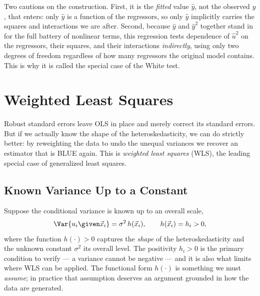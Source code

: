 
Two cautions on the construction. First, it is the \emph{fitted} value $\hat y$, not the observed $y$, that enters: only $\hat y$ is a function of the regressors, so only $\hat y$ implicitly carries the squares and interactions we are after. Second, because $\hat y$ and $\hat y^2$ together stand in for the full battery of nonlinear terms, this regression tests dependence of $\hat u^2$ on the regressors, their squares, and their interactions \emph{indirectly}, using only two degrees of freedom regardless of how many regressors the original model contains. This is why it is called the special case of the White test.

\section{Weighted Least Squares}
\label{sec:wls}

Robust standard errors leave OLS in place and merely correct its standard errors. But if we actually know the shape of the heteroskedasticity, we can do strictly better: by reweighting the data to undo the unequal variances we recover an estimator that is BLUE again. This is \emph{weighted least squares} (WLS), the leading special case of generalized least squares.

\subsection{Known Variance Up to a Constant}

Suppose the conditional variance is known up to an overall scale,
\[
\Var{u_i \given \vec x_i} = \sigma^2\, h(\vec x_i), \qquad h(\vec x_i) = h_i > 0 ,
\]
where the function $h(\cdot) > 0$ captures the \emph{shape} of the heteroskedasticity and the unknown constant $\sigma^2$ its overall level. The positivity $h_i > 0$ is the primary condition to verify --- a variance cannot be negative --- and it is also what limits where WLS can be applied. The functional form $h(\cdot)$ is something we must \emph{assume}; in practice that assumption deserves an argument grounded in how the data are generated.

